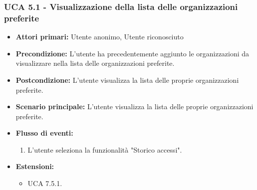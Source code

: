 \subsubsection{UCA 5.1 - Visualizzazione della lista delle organizzazioni preferite}
\begin{itemize}
    \item \textbf{Attori primari:} Utente anonimo, Utente riconosciuto
    \item \textbf{Precondizione:} L'utente ha precedentemente aggiunto le organizzazioni da visualizzare nella lista delle organizzazioni preferite.
    \item \textbf{Postcondizione:} L'utente visualizza la lista delle proprie organizzazioni preferite.
    \item \textbf{Scenario principale:} L'utente visualizza la lista delle proprie organizzazioni preferite.
    \item \textbf{Flusso di eventi:}
    \begin{enumerate}
        \item L'utente seleziona la funzionalità "Storico accessi".
    \end{enumerate}
    \item \textbf{Estensioni:}
    \begin{itemize}
        \item UCA 7.5.1.
    \end{itemize}
\end{itemize}

